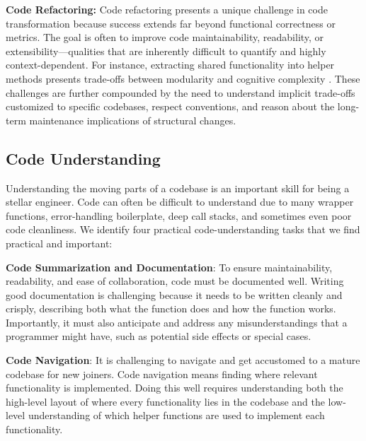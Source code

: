 \textbf{Code Refactoring:} Code refactoring presents a unique challenge in code transformation because success extends far beyond functional correctness or metrics. The goal is often to improve code maintainability, readability, or extensibility—qualities that are inherently difficult to quantify and highly context-dependent.
% 
For instance, extracting shared functionality into helper methods presents trade-offs between modularity and cognitive complexity \citep{parnas1972criteria}.
%
% 
These challenges are further compounded by the need to understand implicit trade-offs customized to specific codebases, respect conventions, and reason about the long-term maintenance implications of structural changes.

\vspace{-0.25cm}

\subsection{Code Understanding}

\vspace{-0.1cm}

Understanding the moving parts of a codebase is an important skill for being a stellar engineer. Code can often be difficult to understand due to many wrapper functions, error-handling boilerplate, deep call stacks, and sometimes even poor code cleanliness. We identify four practical code-understanding tasks that we find practical and important:

\textbf{Code Summarization and Documentation}: To ensure maintainability, readability, and ease of collaboration, code must be documented well. Writing good documentation is challenging because it needs to be written cleanly and crisply, describing both what the function does and how the function works. Importantly, it must also anticipate and address any misunderstandings that a programmer might have, such as potential side effects or special cases.

\textbf{Code Navigation}: It is challenging to navigate and get accustomed to a mature codebase for new joiners. Code navigation means finding where relevant functionality is implemented. Doing this well requires understanding both the high-level layout of where every functionality lies in the codebase and the low-level understanding of which helper functions are used to implement each functionality. 

